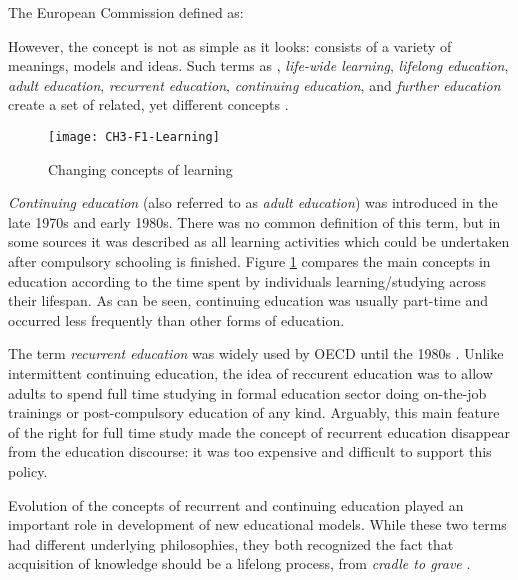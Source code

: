 The European Commission \citeyearpar{EuropeanCommission2000} defined \LLLs as:


However, the concept is not as simple as it looks: \LLLs consists of a variety
of meanings, models and ideas. Such terms as \textit{\LLLsn}, \textit{life-wide
learning}, \textit{lifelong education}, \textit{adult education},
\textit{recurrent education}, \textit{continuing education}, and \textit{further
education} create a set of related, yet different concepts \citep{Hager2011}.

\begin{figure}[htb]
\centering
\texttt{[image: CH3-F1-Learning]}
\caption[Changing concepts of learning]{Changing concepts of learning 
\citep{Jarvis2004}}
\label{fig:learning}
\end{figure}

\textit{Continuing education} (also referred to as \textit{adult education}) was
introduced in the late 1970s and early 1980s. There was no common definition of
this term, but in some sources  \citep{Jarvis2004} it was described as all
learning activities which could be undertaken after compulsory schooling is
finished. Figure \ref{fig:learning} compares the main concepts in education
according to the time spent by individuals learning/studying across their
lifespan. As can be seen, continuing education was usually part-time and
occurred less frequently than other forms of education.

\FloatBarrier
The term \textit{recurrent education} was widely used by OECD until the 1980s
\citep{Jarvis2004}. Unlike intermittent continuing education, the idea of
reccurent education was to allow adults to spend full time studying in
formal education sector doing on-the-job trainings or post-compulsory education
of any kind. Arguably, this main feature of the right for full time study made
the concept of recurrent education disappear from the education discourse: it
was too expensive and difficult to support this policy.

Evolution of the concepts of recurrent and continuing education played an
important role in development of new educational models. While these two terms
had different underlying philosophies, they both recognized the fact that
acquisition of knowledge should be a lifelong process, from \textit{cradle to
grave} \citep{Hargreaves2004}.

